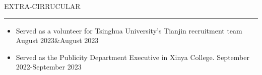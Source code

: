 \documentclass{resume} %
\renewenvironment{rSection}[1]{
\sectionskip
\textcolor{TsinghuaPurple}{\MakeUppercase{#1}}
\sectionlineskip
\hrule
\begin{list}{}{
\setlength{\leftmargin}{0em}
}
\item[]
}{
\end{list}
}
\begin{document}

\begin{rSection}{Extra-Cirrucular} \itemsep -2pt   

\begin{itemize}
 
\item Served as a volunteer for Tsinghua University’s Tianjin recruitment team \hfill August 2023\&August 2023 
\item Served as the Publicity Department Executive in Xinya College. \hfill September 2022-September 2023  
  
\end{itemize}  


\end{rSection} 

  
\end{document}
